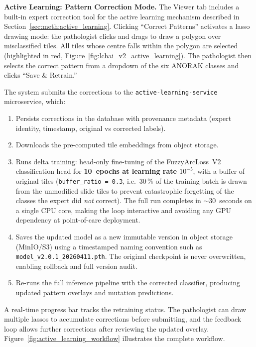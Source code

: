 \textbf{Active Learning: Pattern Correction Mode.}
The Viewer tab includes a built-in expert correction tool for the
active learning mechanism described in
Section~\ref{sec:meth:active_learning}.
Clicking ``Correct Patterns'' activates a lasso drawing mode: the
pathologist clicks and drags to draw a polygon over misclassified tiles.
All tiles whose centre falls within the polygon are selected
(highlighted in red, Figure~\ref{fig:lchai_v2_active_learning}).
The pathologist then selects the correct pattern from a dropdown of
the six ANORAK classes and clicks ``Save \& Retrain.''

The system submits the corrections to the \texttt{active-learning-service}
microservice, which:
\begin{enumerate}
    \item Persists corrections in the database with provenance metadata
    (expert identity, timestamp, original vs corrected labels).
    \item Downloads the pre-computed tile embeddings from object storage.
    \item Runs delta training: head-only fine-tuning of the
    FuzzyArcLoss~V2 classification head for \textbf{10~epochs at
    learning rate $10^{-5}$}, with a buffer of original tiles
    (\texttt{buffer\_ratio = 0.3}, i.e.~30\,\% of the training batch
    is drawn from the unmodified slide tiles to prevent catastrophic
    forgetting of the classes the expert did \emph{not} correct).
    The full run completes in $\sim$30~seconds on a single CPU core,
    making the loop interactive and avoiding any GPU dependency at
    point-of-care deployment.
    \item Saves the updated model as a new immutable version in
    object storage (MinIO/S3) using a timestamped naming convention
    such as \texttt{model\_v2.0.1\_20260411.pth}.
    The original checkpoint is never overwritten, enabling rollback
    and full version audit.
    \item Re-runs the full inference pipeline with the corrected
    classifier, producing updated pattern overlays and mutation
    predictions.
\end{enumerate}

A real-time progress bar tracks the retraining status.
The pathologist can draw multiple lassos to accumulate corrections
before submitting, and the feedback loop allows further corrections
after reviewing the updated overlay.
Figure~\ref{fig:active_learning_workflow} illustrates the complete
workflow.

